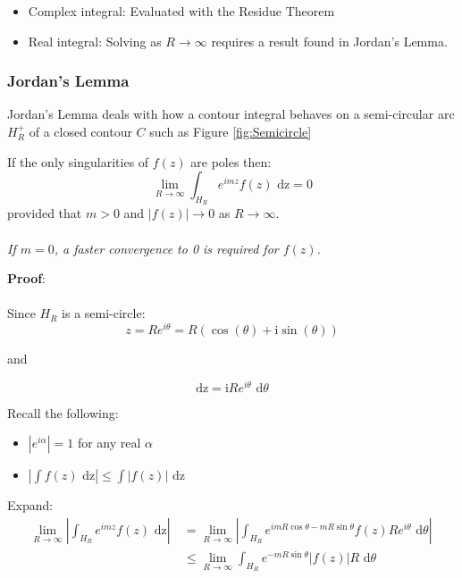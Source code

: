 \documentclass[10pt,a4paper]{article}
\begin{document}
\begin{itemize}
    \item Complex integral: Evaluated with the Residue Theorem
    \item Real integral: Solving as $R\rightarrow \infty$ requires a result found in Jordan's Lemma.
\end{itemize}

\subsubsection{Jordan's Lemma}

Jordan's Lemma deals with how a contour integral behaves on a semi-circular arc $H_R^+$ of a closed
contour $C$ such as Figure \ref{fig:Semicircle}

\begin{tcolorbox}[breakable,colback=white]
If the only singularities of $f(z)$ are poles then: 
$$
\lim_{R\rightarrow \infty} \int_{H_R} e^{imz}f(z) \text{ dz} = 0
$$
provided that $m>0$ and $|f(z)|\rightarrow 0$ as $R\rightarrow \infty$.
\\
\\
\textit{If $m=0$, a faster convergence to 0 is required for $f(z)$.}
\end{tcolorbox}

\textbf{Proof}: 
\\
\\
Since $H_R$ is a semi-circle:
\begin{equation*} 
    z=Re^{i\theta}=R(\cos(\theta)+\text{i}\sin(\theta))
\end{equation*}
\begin{center}
    and
\end{center}
\begin{equation*} 
    \text{dz} = \text{i}Re^{i\theta} \text{ d}\theta
\end{equation*}

Recall the following:
\begin{itemize}
    \item $|e^{i\alpha}|=1$ for any real $\alpha$
    \item $|\int f(z) \text{ dz}|\leq \int |f(z)| \text{ dz}$
\end{itemize}

Expand:
\begin{equation*} 
    \begin{aligned}
        \lim_{R\rightarrow \infty} \left|\int_{H_R}e^{imz}f(z)\text{ dz}\right|\ &= \lim_{R\rightarrow \infty} \left|\int_{H_R}e^{imR\cos \theta - mR\sin \theta}f(z)Re^{i\theta}\text{ d}\theta \right|\ \\
        &\leq \lim_{R\rightarrow \infty} \int_{H_R} e^{-mR\sin \theta} |f(z)|R \text{ d}\theta
    \end{aligned}
\end{equation*}
\end{document}
